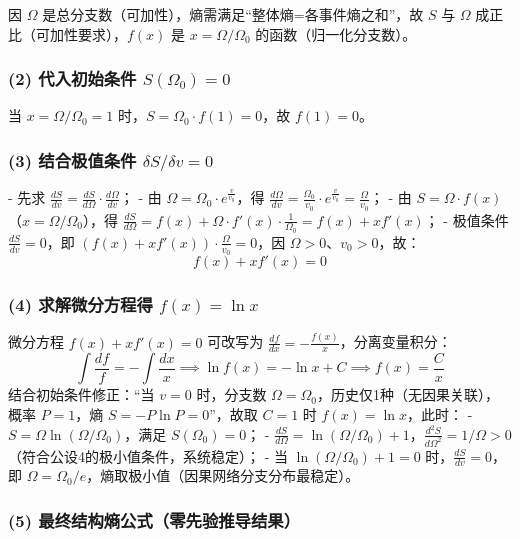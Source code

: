 \documentclass{article}
\begin{document}
因 \( \Omega \) 是总分支数（可加性），熵需满足“整体熵=各事件熵之和”，故 \( S \) 与 \( \Omega \) 成正比（可加性要求），\( f(x) \) 是 \( x = \Omega/\Omega_0 \) 的函数（归一化分支数）。

\subsubsection*{(2) 代入初始条件 \( S(\Omega_0) = 0 \)}

当 \( x = \Omega/\Omega_0 = 1 \) 时，\( S = \Omega_0 \cdot f(1) = 0 \)，故 \( f(1) = 0 \)。

\subsubsection*{(3) 结合极值条件 \( \delta S/\delta v = 0 \)}

- 先求 \( \frac{dS}{dv} = \frac{dS}{d\Omega} \cdot \frac{d\Omega}{dv} \)；
- 由 \( \Omega = \Omega_0 \cdot e^{\frac{v}{v_0}} \)，得 \( \frac{d\Omega}{dv} = \frac{\Omega_0}{v_0} \cdot e^{\frac{v}{v_0}} = \frac{\Omega}{v_0} \)；
- 由 \( S = \Omega \cdot f(x) \)（\( x = \Omega/\Omega_0 \)），得 \( \frac{dS}{d\Omega} = f(x) + \Omega \cdot f'(x) \cdot \frac{1}{\Omega_0} = f(x) + x f'(x) \)；
- 极值条件 \( \frac{dS}{dv} = 0 \)，即 \( (f(x) + x f'(x)) \cdot \frac{\Omega}{v_0} = 0 \)，因 \( \Omega > 0 \)、\( v_0 > 0 \)，故：
\[
f(x) + x f'(x) = 0
\]

\subsubsection*{(4) 求解微分方程得 \( f(x) = \ln x \)}

微分方程 \( f(x) + x f'(x) = 0 \) 可改写为 \( \frac{df}{dx} = -\frac{f(x)}{x} \)，分离变量积分：
\[
\int \frac{df}{f} = -\int \frac{dx}{x} \implies \ln f(x) = -\ln x + C \implies f(x) = \frac{C}{x}
\]
结合初始条件修正：“当 \( v=0 \) 时，分支数 \( \Omega = \Omega_0 \)，历史仅1种（无因果关联），概率 \( P=1 \)，熵 \( S = -P \ln P = 0 \)”，故取 \( C=1 \) 时 \( f(x) = \ln x \)，此时：
- \( S = \Omega \ln(\Omega/\Omega_0) \)，满足 \( S(\Omega_0) = 0 \)；
- \( \frac{dS}{d\Omega} = \ln(\Omega/\Omega_0) + 1 \)，\( \frac{d^2S}{d\Omega^2} = 1/\Omega > 0 \)（符合公设4的极小值条件，系统稳定）；
- 当 \( \ln(\Omega/\Omega_0) + 1 = 0 \) 时，\( \frac{dS}{dv} = 0 \)，即 \( \Omega = \Omega_0 / e \)，熵取极小值（因果网络分支分布最稳定）。

\subsubsection*{(5) 最终结构熵公式（零先验推导结果）}
\end{document}
